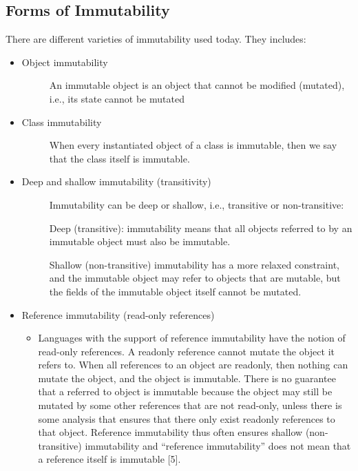 \documentclass[12pt,twoside]{article}
\begin{document}
\subsection{Forms of Immutability}
There are different varieties of immutability used today. They includes:
\begin{itemize}
    \item Object immutability
    \begin{description}
        \item[] An immutable object is an object that cannot be modified (mutated), i.e., its state cannot be mutated
    \end{description}
    \item Class immutability 
    \begin{description}
        \item[] When every instantiated object of a class is immutable, then we say that the class itself is immutable.
    \end{description}
    \item Deep and shallow immutability (transitivity)\begin{description}
        \item[] Immutability can be deep or shallow, i.e., transitive or non-transitive:
        \item[]Deep (transitive): immutability means that all objects referred to by an immutable object must also be immutable.
        \item[]Shallow (non-transitive) immutability has a more relaxed constraint, and the immutable object may refer to objects that are mutable, but the fields of the immutable object itself cannot be mutated.
    \end{description}    
    \item Reference immutability (read-only references)
     \begin{itemize}
    \item[] Languages with the support of reference immutability have the notion of read-only references. A readonly reference cannot mutate the object it refers to. When all references to an object are readonly, then nothing can mutate the object, and the object is immutable. There is no guarantee that a referred to object is immutable because the object may still be mutated by some other references that are not read-only, unless there is some analysis that ensures that there only exist readonly references to that object. Reference immutability thus often ensures shallow (non-transitive) immutability and “reference immutability” does not mean that a reference itself is immutable [5].
\end{itemize}



\end{itemize}
\end{document}
